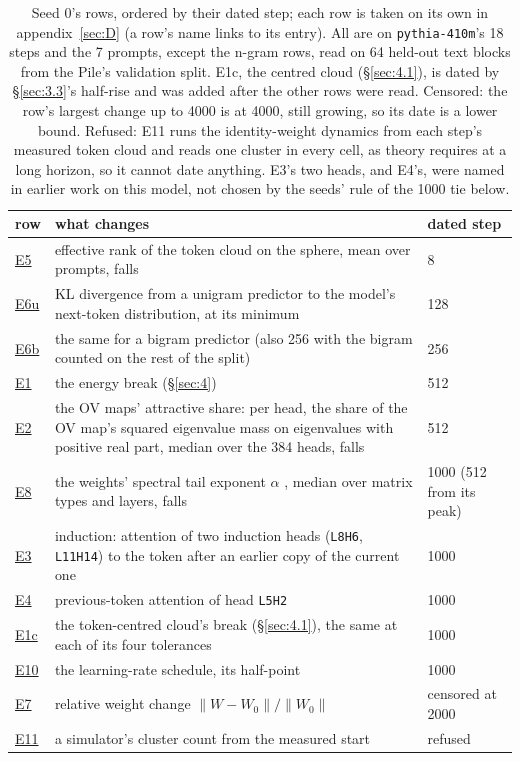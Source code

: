 \documentclass[11pt]{article}
\begin{document}
\begin{table}[tbp]
\centering\small
\caption{Seed 0's rows, ordered by their dated step; each row is taken on its own in appendix~\ref{sec:D} (a row's name links to its entry). All are on \texttt{pythia-410m}'s 18 steps and the 7 prompts, except the n-gram rows, read on 64 held-out text blocks from the Pile's validation split. E1c, the centred cloud (\S\ref{sec:4.1}), is dated by \S\ref{sec:3.3}'s half-rise and was added after the other rows were read. Censored: the row's largest change up to 4000 is at 4000, still growing, so its date is a lower bound. Refused: E11 runs the identity-weight dynamics from each step's measured token cloud and reads one cluster in every cell, as theory requires at a long horizon, so it cannot date anything. E3's two heads, and E4's, were named in earlier work on this model, not chosen by the seeds' rule of the 1000 tie below.}\label{tab:rows}
\begin{tabularx}{\linewidth}{@{}l X l@{}}
\toprule
row & what changes & dated step \\
\midrule
\hyperref[sec:D:E5]{E5} & effective rank of the token cloud on the sphere, mean over prompts, falls & 8 \\
\hyperref[sec:D:E6]{E6u} & KL divergence from a unigram predictor to the model's next-token distribution, at its minimum & 128 \\
\hyperref[sec:D:E6]{E6b} & the same for a bigram predictor (also 256 with the bigram counted on the rest of the split) & 256 \\
\hyperref[sec:D:E1]{E1} & the energy break (\S\ref{sec:4}) & 512 \\
\hyperref[sec:D:E2]{E2} & the OV maps' attractive share: per head, the share of the OV map's squared eigenvalue mass on eigenvalues with positive real part, median over the 384 heads, falls & 512 \\
\hyperref[sec:D:E8]{E8} & the weights' spectral tail exponent $\alpha $ \citep{martin2019}, median over matrix types and layers, falls & 1000 (512 from its peak) \\
\hyperref[sec:D:E3]{E3} & induction: attention of two induction heads (\texttt{L8H6}, \texttt{L11H14}) to the token after an earlier copy of the current one & 1000 \\
\hyperref[sec:D:E4]{E4} & previous-token attention of head \texttt{L5H2} & 1000 \\
\hyperref[sec:D:E1c]{E1c} & the token-centred cloud's break (\S\ref{sec:4.1}), the same at each of its four tolerances & 1000 \\
\hyperref[sec:D:E10]{E10} & the learning-rate schedule, its half-point & 1000 \\
\hyperref[sec:D:E7]{E7} & relative weight change $\|W - W_{0}\| / \|W_{0}\|$ & censored at 2000 \\
\hyperref[sec:D:E11]{E11} & a simulator's cluster count from the measured start & refused \\
\bottomrule
\end{tabularx}
\end{table}
\end{document}

